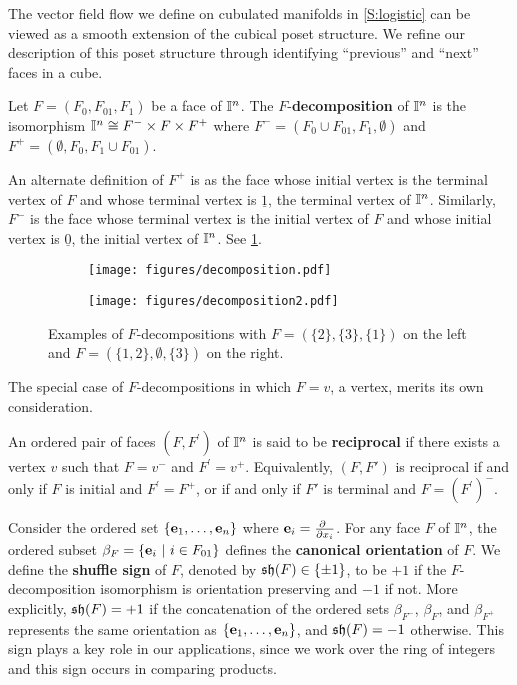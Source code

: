 The vector field flow we define on cubulated manifolds in \cref{S:logistic} can be viewed as a smooth extension of the cubical poset structure.
We refine our description of this poset structure through identifying ``previous'' and ``next'' faces in a cube.

\begin{definition}\label{D:F decomposition}
	Let $F = (F_0, F_{01}, F_1)$ be a face of $\mathbb{I}^n$.
	The $F$-\textbf{decomposition} of $\mathbb{I}^n$ is the isomorphism $\mathbb{I}^n \cong F^- \times F \times F^+$ where $F^- = (F_0 \cup F_{01}, F_1, \emptyset)$ and $F^+ = (\emptyset, F_0, F_1 \cup F_{01})$.
\end{definition}

An alternate definition of $F^+$ is as the face whose initial vertex is the terminal vertex of $F$ and whose terminal vertex is $\underline{1}$,
the terminal vertex of $\mathbb{I}^n$.
Similarly, $F^-$ is the face whose terminal vertex is the initial vertex of $F$ and whose initial vertex is $\underline{0}$, the initial vertex of $\mathbb{I}^n$.
See \cref{F:decomposition}.

\begin{figure}[h!]
	\begin{subfigure}[b]{0.35\textwidth}
		\centering
		\texttt{[image: figures/decomposition.pdf]}
	\end{subfigure}
	\begin{subfigure}[b]{0.35\textwidth}
		\centering
		\texttt{[image: figures/decomposition2.pdf]}
	\end{subfigure}
	\caption{Examples of $F$-decompositions with $F = (\{2\}, \{3\}, \{1\})$ on the left and $F = (\{1,2\}, \emptyset, \{3\})$ on the right.}
	\label{F:decomposition}
\end{figure}

The special case of $F$-decompositions in which $F = v$, a vertex, merits its own consideration.

\begin{definition}\label{D:reciprocal}
	An ordered pair of faces $(F,F^\prime)$ of $\mathbb{I}^n$ is said to be \textbf{reciprocal} if there exists a vertex $v$ such that $F = v^-$ and $F^\prime = v^+$.
	Equivalently, $(F, F')$ is reciprocal if and only if $F$ is initial and $F^\prime = F^+$, or if and only if $F'$ is terminal and $F = (F^{\prime})^-$.
\end{definition}

Consider the ordered set $\{\mathbf{e}_1, \dots, \mathbf{e}_n\}$ where $\e_i = \frac{\partial\ }{\partial x_i}$.
For any face $F$ of $\mathbb{I}^n$, the ordered subset $\beta_F = \{\mathbf{e}_i\ |\ i \in F_{01}\}$ defines the \textbf{canonical orientation} of $F$.
We define the \textbf{shuffle sign} of $F$, denoted by $\mathfrak{sh}(F) \in \{\pm 1\}$, to be $+1$ if the $F$-decomposition isomorphism is orientation preserving and $-1$ if not.
More explicitly, $\mathfrak{sh}(F) = +1$ if the concatenation of the ordered sets $\beta_{F^-}$, $\beta_{F}$, and $\beta_{F^+}$ represents the same orientation as $\{\mathbf{e}_1, \dots, \mathbf{e}_n\}$, and $\mathfrak{sh}(F) = -1$ otherwise.
This sign plays a key role in our applications, since we work over the ring of integers and this sign occurs in comparing products.

